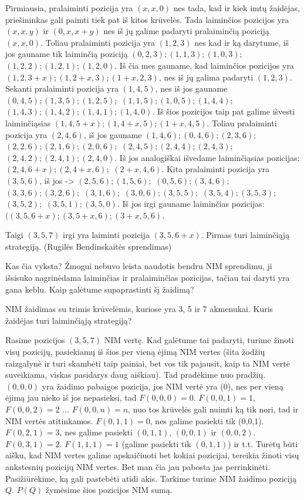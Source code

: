 Pirmiausia, pralaiminti pozicija yra $(x, x, 0)$ nes tada, kad ir kiek imtų
žaidėjas, priešininkas gali paimti tiek pat iš kitos krūvelės. Tada laiminčios
pozicijos yra $(x, x, y)$ ir $(0, x, x+y)$ nes iš jų galime padaryti
pralaiminčią poziciją $(x, x, 0)$. Toliau pralaiminti pozicija yra $(1, 2, 3)$
nes kad ir ką darytume, iš jos gauname tik laiminčią poziciją $(0, 2, 3);  (1,
1, 3);  (1, 0, 3);$ $ (1, 2, 2);  (1, 2, 1);  (1, 2, 0)$. Iš čia mes gauname,
kad laiminčios pozicijos yra $(1, 2, 3+x); (1, 2+x, 3);  (1+x, 2, 3)$, nes iš
jų galima padaryti $(1, 2, 3)$. Sekanti pralaiminti pozicija yra $(1, 4, 5)$,
nes iš jos gauname  $(0, 4, 5);  (1, 3, 5);  (1, 2, 5);$ $ (1, 1, 5);  (1, 0,
5);  (1, 4, 4);$ $ (1, 4, 3);  (1, 4, 2);  (1, 4, 1);  (1, 4, 0)$. Iš šios
pozicijos taip pat galime išvesti laiminčiąsias $(1, 4, 5+x);  (1, 4+x, 5);
(1+x, 4, 5)$. Toliau pralaiminti pozicija yra $(2, 4, 6)$, iš jos gauname $(1,
4, 6);  (0, 4, 6);  (2, 3, 6); $ $ (2, 2, 6);  (2, 1, 6);  (2, 0, 6); $ $ (2,
4, 5);  (2, 4, 4);  (2, 4, 3);$ $ (2, 4, 2);  (2, 4, 1);  (2, 4, 0)$.  Iš jos
analogiškai išvedame laiminčiąsias pozicijas: $(2, 4, 6+x);  (2, 4+x, 6); $ $
(2+x, 4, 6)$. Kita pralaiminti pozicija yra $(3, 5, 6)$, iš jos -> $(2, 5, 6);
(1, 5, 6);$ $(0, 5, 6);  (3, 4, 6);$ $(3, 3, 6);  (3, 2, 6); $ $(3, 1, 6);$
$(3, 0, 6);  (3, 5, 5); $ $(3, 5, 4);  (3, 5, 3); $ $(3, 5, 2);$ $(3, 5, 1); (
3, 5, 0)$. Iš jos irgi gauname laiminčias pozicijas: $((3, 5, 6+x);  (3, 5+x,
6); (3+x, 5, 6)$.

Taigi $(3, 5, 7)$ irgi yra laiminti pozicija $(3, 5, 6+x)$.  Pirmas turi
laiminčiąją strategiją.  (Rugilės Bendinskaitės sprendimas)

Kas čia vyksta? Žmogui nebuvo leista naudotis bendru NIM sprendimu, ji išsisuko
nagrinėdama laiminčias ir pralaiminčias pozicijas, tačiau tai daryti yra gana
keblu. Kaip galėtume supaprastinti šį žaidimą? 

\begin{pavnr}
  NIM žaidimas su trimis krūvelėmis, kuriose yra 3, 5 ir 7 akmenukai. Kuris
  žaidėjas turi laiminčiąją strategiją?
\end{pavnr}

Rasime pozicijos $(3,5,7)$ NIM vertę. Kad galėtume tai padaryti, turime žinoti
visų pozicijų, pasiekiamų iš šios per vieną ėjimą NIM vertes (šita žodžių
raizgalynė ir turi skambėti taip painiai, bet vos tik pajausit, kaip ta NIM
vertė suveikiama, viskas pasidarys daug aiškiau). Tad pradėkime nuo pradžių.
$(0,0,0)$ yra žaidimo pabaigos pozicija, jos NIM vertė yra (0), nes per vieną
ėjimą jau nieko iš jos nepasieksi, tad $F(0,0,0)=0$. $F(0,0,1)=1$, $F(0,0,2)=2$
$\ldots$ $F(0,0,n)=n$, nuo tos krūvelės gali nuimti ką tik nori, tad ir NIM
vertės atitinkamos. $F(0,1,1)=0$, nes galime pasiekti tik (0,0,1).
$F(0,2,1)=3$, nes galime pasiekti $(0,1,1)$, $(0,0,1)$ ir $(0,0,2)$.
$F(0,3,1)=2$. $F(1,1,1)=1$ (galime pasiekti tik $(0,1,1)$) ir t.t. Turėtų būti
aišku, kad NIM vertes galime apskaičiuoti bet kokiai pozicijai, tereikia žinoti
visų ankstesnių pozicijų NIM vertes. Bet man čia jau pabosta jas perrinkinėti.
Pasižiūrėkime, ką gali pastebėti atidi akis. Tarkime turime NIM žaidimo
poziciją $Q$. $P(Q)$ žymėsime šios pozicijos NIM sumą.

